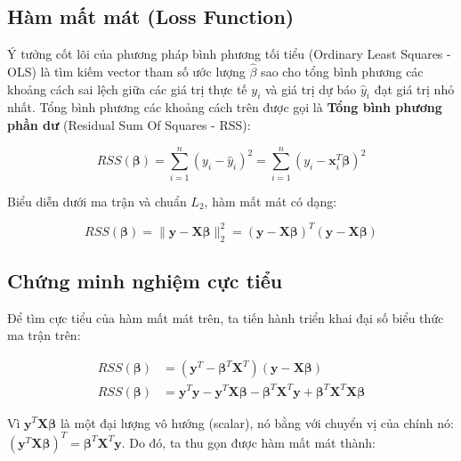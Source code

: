 \subsection{Hàm mất mát (Loss Function)}

Ý tưởng cốt lõi của phương pháp bình phương tối tiểu (Ordinary Least Squares - OLS) là tìm kiếm vector tham số ước lượng $\hat{\beta}$ sao cho tổng bình phương các khoảng cách sai lệch giữa các giá trị thực tế $y_i$ và giá trị dự báo $\hat{y}_i$ đạt giá trị nhỏ nhất. Tổng bình phương các khoảng cách trên được gọi là \textbf{Tổng bình phương phần dư} (Residual Sum Of Squares - RSS):

\begin{equation}
    RSS(\boldsymbol{\beta}) = \sum_{i=1}^{n} (y_i - \hat{y}_i)^2 = \sum_{i=1}^{n} (y_i - \mathbf{x}_i^T\boldsymbol{\beta})^2
\end{equation}

Biểu diễn dưới ma trận và chuẩn $L_2$, hàm mất mát có dạng:

\begin{equation}
    RSS(\boldsymbol{\beta}) = \|\mathbf{y} - \mathbf{X}\boldsymbol{\beta}\|_2^2 = (\mathbf{y} - \mathbf{X}\boldsymbol{\beta})^T(\mathbf{y} - \mathbf{X}\boldsymbol{\beta})
\end{equation}

\subsection{Chứng minh nghiệm cực tiểu}

Để tìm cực tiểu của hàm mất mát trên, ta tiến hành triển khai đại số biểu thức ma trận trên:

\vspace{-0.5em}

\begin{align}
    RSS(\boldsymbol{\beta}) &= (\mathbf{y}^T - \boldsymbol{\beta}^T\mathbf{X}^T)(\mathbf{y} - \mathbf{X}\boldsymbol{\beta}) \\
    RSS(\boldsymbol{\beta}) &= \mathbf{y}^T\mathbf{y} - \mathbf{y}^T\mathbf{X}\boldsymbol{\beta} - \boldsymbol{\beta}^T\mathbf{X}^T\mathbf{y} + \boldsymbol{\beta}^T\mathbf{X}^T\mathbf{X}\boldsymbol{\beta}
\end{align}

Vì $\mathbf{y}^T\mathbf{X}\boldsymbol{\beta}$ là một đại lượng vô hướng (scalar), nó bằng với chuyển vị của chính nó: $(\mathbf{y}^T\mathbf{X}\boldsymbol{\beta})^T = \boldsymbol{\beta}^T\mathbf{X}^T\mathbf{y}$. Do đó, ta thu gọn được hàm mất mát thành:

